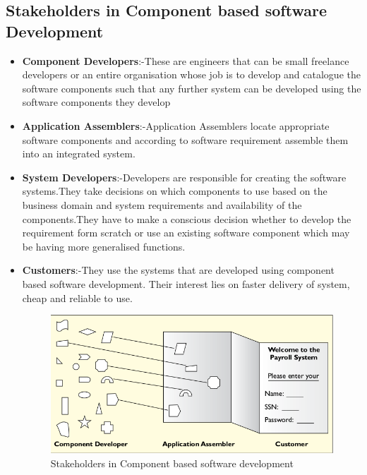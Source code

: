 \documentclass[12pt]{article}
\begin{document}
\subsection{Stakeholders in Component based software Development}
\begin{itemize}
	\item \textbf{Component Developers}:-These are engineers that can be small freelance developers or an entire organisation whose job is to develop and catalogue the software components such that any further system can be developed using the software components they develop
	\item \textbf{Application Assemblers}:-Application Assemblers locate appropriate software components and according to software requirement assemble them into an integrated system.
	\item \textbf{System Developers}:-Developers are responsible for creating the software systems.They take decisions on which components to use based on the business domain and system requirements and availability of the components.They have to make a conscious decision whether to develop the requirement form scratch or use an existing software component which may be having more generalised functions. 
	\item \textbf{Customers}:-They use the systems that are developed using component based software development. Their interest lies on faster delivery of system, cheap and reliable to use.
	\begin{center}
		\begin{figure}
			\caption{Stakeholders in Component based software development}
			\includegraphics[scale=0.6]{stakeholders.png}
		\end{figure}
	\end{center}
	
\end{itemize}
\end{document}
